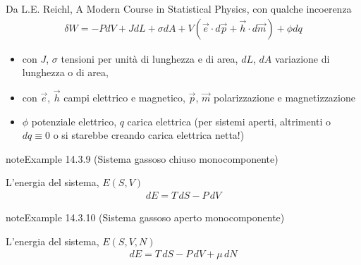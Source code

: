 \documentclass[letterpaper,10pt,italian]{jupyterBook}
\begin{document}
\sphinxAtStartPar
Da L.E. Reichl, A Modern Course in Statistical Physics, con qualche incoerenza  
\begin{equation*}
\begin{split}\delta W = - P dV + J dL + \sigma d A + V \left( \vec{e} \cdot d \vec{p} + \vec{h} \cdot d \vec{m}\right) + \phi d q \end{split}
\end{equation*}\begin{itemize}
\item {} 
\sphinxAtStartPar
con \(J\), \(\sigma\) tensioni per unità di lunghezza e di area, \(d L \), \(d A\) variazione di lunghezza o di area,

\item {} 
\sphinxAtStartPar
con \(\vec{e}\), \(\vec{h}\) campi elettrico e magnetico, \(\vec{p}\), \(\vec{m}\) polarizzazione e magnetizzazione

\item {} 
\sphinxAtStartPar
\(\phi\) potenziale elettrico, \(q\) carica elettrica (per sistemi aperti, altrimenti o \(dq \equiv 0\) o si starebbe creando carica elettrica netta!)

\end{itemize}
\label{ch/thermodynamics/principles-gibbs-phase-rule:example-12}
\begin{sphinxadmonition}{note}{Example 14.3.9 (Sistema gassoso chiuso monocomponente)}



\sphinxAtStartPar
L’energia del sistema, \(E(S,V)\)
\begin{equation*}
\begin{split}dE = T \, dS - P \, dV\end{split}
\end{equation*}\end{sphinxadmonition}
\label{ch/thermodynamics/principles-gibbs-phase-rule:example-13}
\begin{sphinxadmonition}{note}{Example 14.3.10 (Sistema gassoso aperto monocomponente)}



\sphinxAtStartPar
L’energia del sistema, \(E(S,V,N)\)
\begin{equation*}
\begin{split}dE = T \, dS - P \, dV + \mu \, dN\end{split}
\end{equation*}\end{sphinxadmonition}
\label{ch/thermodynamics/principles-gibbs-phase-rule:example-14}
\end{document}
